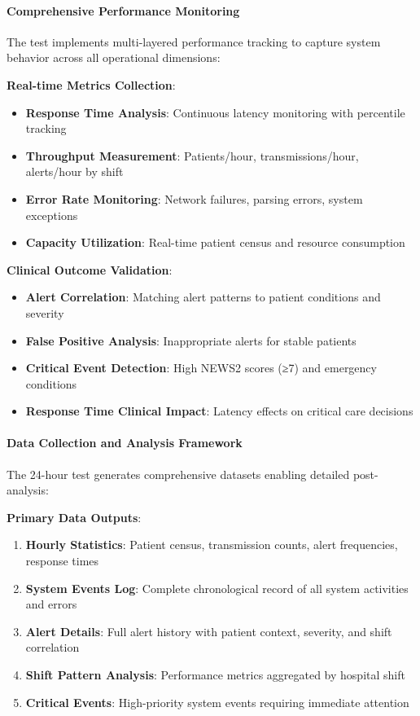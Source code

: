 \paragraph{Comprehensive Performance Monitoring}
The test implements multi-layered performance tracking to capture system behavior across all operational dimensions:

\textbf{Real-time Metrics Collection}:
\begin{itemize}
    \item \textbf{Response Time Analysis}: Continuous latency monitoring with percentile tracking
    \item \textbf{Throughput Measurement}: Patients/hour, transmissions/hour, alerts/hour by shift
    \item \textbf{Error Rate Monitoring}: Network failures, parsing errors, system exceptions
    \item \textbf{Capacity Utilization}: Real-time patient census and resource consumption
\end{itemize}

\textbf{Clinical Outcome Validation}:
\begin{itemize}
    \item \textbf{Alert Correlation}: Matching alert patterns to patient conditions and severity
    \item \textbf{False Positive Analysis}: Inappropriate alerts for stable patients
    \item \textbf{Critical Event Detection}: High NEWS2 scores (≥7) and emergency conditions
    \item \textbf{Response Time Clinical Impact}: Latency effects on critical care decisions
\end{itemize}

\paragraph{Data Collection and Analysis Framework}
The 24-hour test generates comprehensive datasets enabling detailed post-analysis:

\textbf{Primary Data Outputs}:
\begin{enumerate}
    \item \textbf{Hourly Statistics}: Patient census, transmission counts, alert frequencies, response times
    \item \textbf{System Events Log}: Complete chronological record of all system activities and errors
    \item \textbf{Alert Details}: Full alert history with patient context, severity, and shift correlation
    \item \textbf{Shift Pattern Analysis}: Performance metrics aggregated by hospital shift
    \item \textbf{Critical Events}: High-priority system events requiring immediate attention
\end{enumerate}

